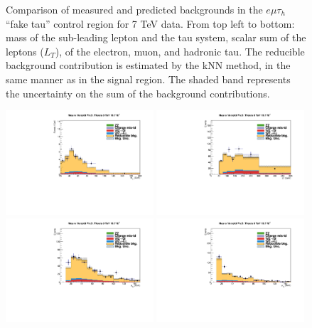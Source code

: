\begin{figure}
\begin{center}
  \caption{Comparison of measured and predicted backgrounds in the $e\mu\tau_h$ ``fake tau'' control region for 7 TeV data.
  From top left to bottom: mass of the sub-leading lepton and the tau system, scalar sum of the leptons \pT ($L_T$), \pT of the electron, muon, and hadronic tau.
  The reducible background contribution is estimated by the kNN method, in the same manner as in the signal region.
  The shaded band represents the uncertainty on the sum of the background contributions.
  }
  \label{fig:LLT_emt_f3_control_7TeV}
\end{center}
\end{figure}

\begin{figure}
\begin{center}
  \includegraphics[width=0.49\textwidth]{4_Analisys/pics/8TeV/plots/emt/f3/Full/final-f3-subMass-Full.pdf}
  \includegraphics[width=0.49\textwidth]{4_Analisys/pics/8TeV/plots/emt/f3/final-f3-LT.pdf}\\
  \includegraphics[width=0.49\textwidth]{4_Analisys/pics/8TeV/plots/emt/f3/Full/final-f3-ePt-Full.pdf}
  \includegraphics[width=0.49\textwidth]{4_Analisys/pics/8TeV/plots/emt/f3/Full/final-f3-mPt-Full.pdf}\\

\end{center}
\end{figure}

